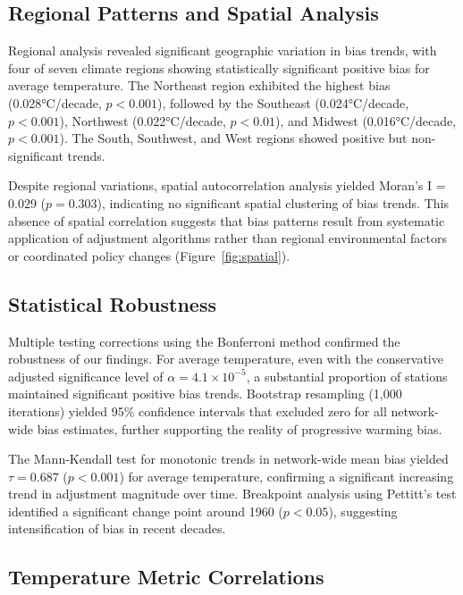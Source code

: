 \documentclass[11pt, a4paper]{article}
\begin{document}
\subsection{Regional Patterns and Spatial Analysis}

Regional analysis revealed significant geographic variation in bias trends, with four of seven climate regions showing statistically significant positive bias for average temperature. The Northeast region exhibited the highest bias (0.028°C/decade, $p < 0.001$), followed by the Southeast (0.024°C/decade, $p < 0.001$), Northwest (0.022°C/decade, $p < 0.01$), and Midwest (0.016°C/decade, $p < 0.001$). The South, Southwest, and West regions showed positive but non-significant trends.

Despite regional variations, spatial autocorrelation analysis yielded Moran's I = 0.029 ($p = 0.303$), indicating no significant spatial clustering of bias trends. This absence of spatial correlation suggests that bias patterns result from systematic application of adjustment algorithms rather than regional environmental factors or coordinated policy changes (Figure~\ref{fig:spatial}).

\subsection{Statistical Robustness}

Multiple testing corrections using the Bonferroni method confirmed the robustness of our findings. For average temperature, even with the conservative adjusted significance level of $\alpha = 4.1 \times 10^{-5}$, a substantial proportion of stations maintained significant positive bias trends. Bootstrap resampling (1,000 iterations) yielded 95\% confidence intervals that excluded zero for all network-wide bias estimates, further supporting the reality of progressive warming bias.

The Mann-Kendall test for monotonic trends in network-wide mean bias yielded $\tau = 0.687$ ($p < 0.001$) for average temperature, confirming a significant increasing trend in adjustment magnitude over time. Breakpoint analysis using Pettitt's test identified a significant change point around 1960 ($p < 0.05$), suggesting intensification of bias in recent decades.

\subsection{Temperature Metric Correlations}
\end{document}
